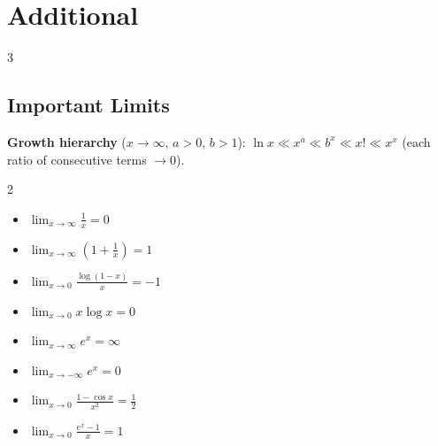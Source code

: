 \section{Additional}

\setlength{\tabcolsep}{2pt}
\renewcommand{\arraystretch}{1.04}

\begin{multicols}{3}

\subsection*{Important Limits}
\textbf{Growth hierarchy} ($x\to\infty$, $a>0$, $b>1$): $\ln x \ll x^a \ll b^x \ll x! \ll x^x$ (each ratio of consecutive terms $\to0$).

\begin{multicols}{2}
\begin{itemize}[noitemsep, topsep=0pt, leftmargin=*]
\item $\lim_{x\to\infty}\frac1x=0$
\item $\lim_{x\to\infty}\left(1+\frac1x\right)=1$
\item $\lim_{x\to0}\frac{\log(1-x)}x=-1$
\item $\lim_{x\to0}x\log x=0$

\item $\lim_{x\to\infty}e^x=\infty$
\item $\lim_{x\to-\infty}e^x=0$
\item $\lim_{x\to0}\frac{1-\cos x}{x^2}=\frac12$
\item $\lim_{x\to0}\frac{e^x-1}{x}=1$


\end{itemize}
\end{multicols}
\end{multicols}

